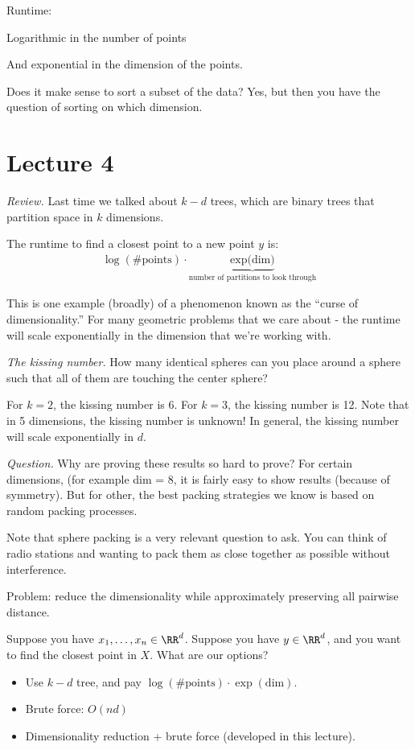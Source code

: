 Runtime:

Logarithmic in the number of points

And exponential in the dimension of the points.

Does it make sense to sort a subset of the data?  Yes, but then you have the question of sorting on which dimension.

\section{Lecture 4}

{\it Review.} Last time we talked about $k-d$ trees, which are binary trees that partition space in $k$ dimensions.

The runtime to find a closest point to a new point $y$ is:
\begin{align*}
  \log (\text{\# points}) \cdot \underbrace{\text{exp(dim)}}_{\text{number of partitions to look through}}
\end{align*}

This is one example (broadly) of a phenomenon known as the ``curse of dimensionality.''  For many geometric problems that we care about - the runtime will scale exponentially in the dimension that we're working with.

{\it The kissing number.} How many identical spheres can you place around a sphere such that all of them are touching the center sphere?

For $k=2$, the kissing number is 6.  For $k=3$, the kissing number is 12.  Note that in 5 dimensions, the kissing number is unknown!  In general, the kissing number will scale exponentially in $d$.

{\it Question.} Why are proving these results so hard to prove?  For certain dimensions, (for example dim = 8, it is fairly easy to show results (because of symmetry).  But for other, the best packing strategies we know is based on random packing processes.

Note that sphere packing is a very relevant question to ask.  You can think of radio stations and wanting to pack them as close together as possible without interference.

Problem: reduce the dimensionality while approximately preserving all pairwise distance.

Suppose you have $x_1, \dots, x_n \in \RR^d$.  Suppose you have $y \in \RR^d$, and you want to find the closest point in $X$.  What are our options?

\begin{itemize}
  \item Use $k-d$ tree, and pay $\log (\text{\# points}) \cdot \exp(\text{dim})$.
  \item Brute force: $O(nd)$
  \item Dimensionality reduction + brute force (developed in this lecture).
\end{itemize}

